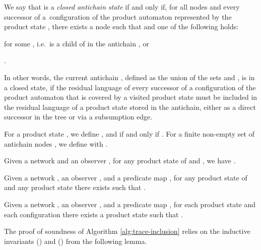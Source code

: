 \documentclass{llncs}
\begin{document}
We say that  is a \emph{closed
  antichain state} if and only if, for all nodes  and every successor  of 
a~configuration of the product automaton  represented by the product state , there exists a
node  such that
 and one of
the following holds: \begin{compactitem}
  \item  for some , i.e.\  is a
    child of  in the antichain
    , or
\item .
  \end{compactitem}
In other words, the current antichain , defined as the
union of the sets  and , is in a
closed state, if the residual language of every successor of a
configuration of the product automaton  that is covered by a visited product state must be
included in the residual language of a product state stored in the
antichain, either as a direct successor in the tree or via a
subsumption edge.

For a product state , we define , and  if and only if
. For a
finite non-empty set of antichain nodes , we define
 with . 

\begin{lemma}\label{lemma:succ-sem}
  Given a network  and an observer , for any product
  state  of  and , we have
  .
\end{lemma}
\bigskip
 
\begin{lemma}\label{lemma:post-abs}
  Given a network , an observer , and a predicate map
  , for any product state  of  and any
  product state  there exists  such that .
\end{lemma}
\bigskip

\begin{lemma}\label{lemma:succ-post}
  Given a network , an observer , and a predicate map
  , for each product state  and each configuration
   there exists a product state  such that .
\end{lemma}
\bigskip

The proof of soundness of Algorithm \ref{alg:trace-inclusion} relies
on the inductive invariants () and ()
from the following lemma.
\end{document}
